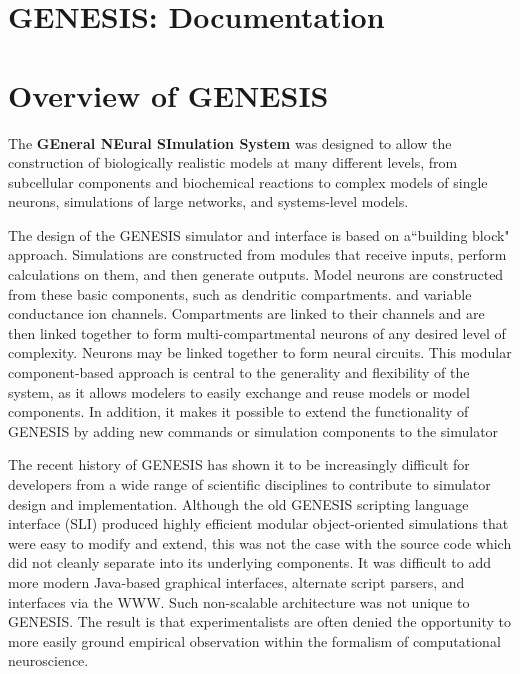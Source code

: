 \documentclass[12pt]{article}
\begin{document}
\section*{GENESIS: Documentation}

\section*{Overview of GENESIS}

The {\bf GEneral NEural SImulation System} was designed to allow the construction of biologically realistic models at many different levels, from subcellular components and biochemical reactions to complex models of single neurons, simulations of large networks, and systems-level models.

The design of the GENESIS simulator and interface is based on a``building block" approach. Simulations are constructed from modules that receive inputs, perform calculations on them, and then generate outputs. Model neurons are constructed from these basic components, such as dendritic compartments. and variable conductance ion channels. Compartments are linked to their channels and are then linked together to form multi-compartmental neurons of any desired level of complexity. Neurons may be linked together to form neural circuits. This modular component-based approach is central to the generality and flexibility of the system, as it allows modelers to easily exchange and reuse models or model components. In addition, it makes it possible to extend the functionality of GENESIS by adding new commands or simulation components to the simulator

The recent history of GENESIS has shown it to be increasingly difficult for developers from a wide range of scientific disciplines to contribute to simulator design and implementation. Although the old GENESIS scripting language interface (SLI) produced highly efficient modular object-oriented simulations that were easy to modify and extend, this was not the case with the source code which did not cleanly separate into its underlying components. It was difficult to add more modern Java-based graphical interfaces, alternate script parsers, and interfaces via the WWW. Such non-scalable architecture was not unique to GENESIS. The result is that experimentalists are often denied the opportunity to more easily ground empirical observation within the formalism of computational neuroscience.
\end{document}
